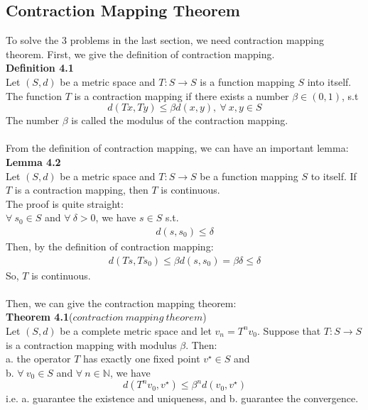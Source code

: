 \documentclass{article}
\begin{document}
\subsection{Contraction Mapping Theorem}
To solve the 3 problems in the last section, we need contraction mapping theorem. First, we give the definition of contraction mapping.\\
\textbf{Definition 4.1}\\
Let $(S, d)$ be a metric space and $T: S \to S$ is a function mapping $S$ into itself. The function $T$ is a contraction mapping if there exists a number $\beta \in (0, 1)$, s.t
\begin{equation*}
	d(Tx, Ty) \leq \beta d(x, y),\ \forall\ x, y \in S 
\end{equation*}
The number $\beta$ is called the modulus of the contraction mapping.\\\\
From the definition of contraction mapping, we can have an important lemma:\\
\textbf{Lemma 4.2}\\
Let $(S, d)$ be a metric space and $T: S \to S$ be a function mapping $S$ to itself. If $T$ is a contraction mapping, then $T$ is continuous.\\
The proof is quite straight:\\
\indent $\forall\ s_0 \in S$ and $\forall\ \delta > 0$, we have $s \in S$ s.t.
\begin{align*}
	d(s, s_0) \leq \delta
\end{align*}
\indent Then, by the definition of contraction mapping:
\begin{align*}
	d(Ts, Ts_0) \leq \beta d(s, s_0) = \beta \delta \leq \delta
\end{align*}
\indent So, $T$ is continuous.\\\\
Then, we can give the contraction mapping theorem:\\
\textbf{Theorem 4.1}($contraction\ mapping\ theorem$)\\
Let $(S, d)$ be a complete metric space and let $v_n = T^n v_0$. Suppose that $T: S \to S$ is a contraction mapping with modulus $\beta$. Then:\\
\indent a. the operator $T$ has exactly one fixed point $v^\star \in S$ and\\
\indent b. $\forall\ v_0 \in S$ and $\forall\ n \in \mathbb{N}$, we have
\begin{equation*}
	d(T^n v_0, v^\star) \leq \beta^n d(v_0, v^\star)
\end{equation*} 
i.e. a. guarantee the existence and uniqueness, and b. guarantee the convergence.
\end{document}
